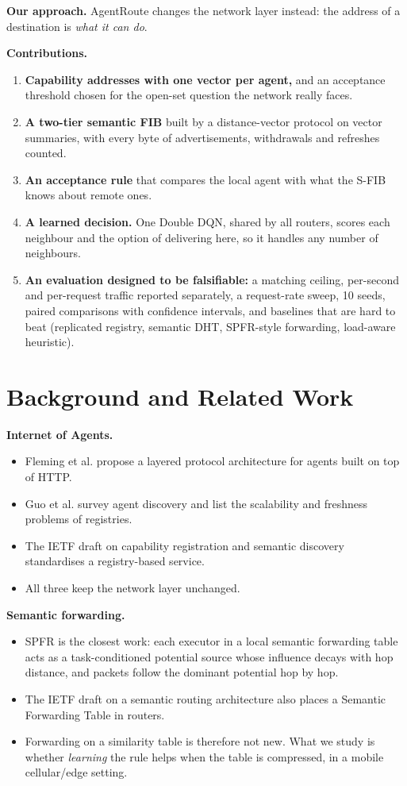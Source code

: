 \documentclass[journal]{IEEEtran}
\begin{document}
\textbf{Our approach.} AgentRoute changes the network layer instead: the address of a destination is \emph{what it can do}.

\textbf{Contributions.}

\begin{enumerate}
\item \textbf{Capability addresses with one vector per agent,} and an acceptance threshold chosen for the open-set question the network really faces.
\item \textbf{A two-tier semantic FIB} built by a distance-vector protocol on vector summaries, with every byte of advertisements, withdrawals and refreshes counted.
\item \textbf{An acceptance rule} that compares the local agent with what the S-FIB knows about remote ones.
\item \textbf{A learned decision.} One Double DQN, shared by all routers, scores each neighbour and the option of delivering here, so it handles any number of neighbours.
\item \textbf{An evaluation designed to be falsifiable:} a matching ceiling, per-second and per-request traffic reported separately, a request-rate sweep, 10 seeds, paired comparisons with confidence intervals, and baselines that are hard to beat (replicated registry, semantic DHT, SPFR-style forwarding, load-aware heuristic).
\end{enumerate}

\section{Background and Related Work}
\textbf{Internet of Agents.}

\begin{itemize}
\item Fleming et al. \cite{ref1} propose a layered protocol architecture for agents built on top of HTTP.
\item Guo et al. \cite{ref3} survey agent discovery and list the scalability and freshness problems of registries.
\item The IETF draft on capability registration and semantic discovery \cite{ref4} standardises a registry-based service.
\item All three keep the network layer unchanged.
\end{itemize}

\textbf{Semantic forwarding.}

\begin{itemize}
\item SPFR \cite{ref2} is the closest work: each executor in a local semantic forwarding table acts as a task-conditioned potential source whose influence decays with hop distance, and packets follow the dominant potential hop by hop.
\item The IETF draft on a semantic routing architecture \cite{ref14} also places a Semantic Forwarding Table in routers.
\item Forwarding on a similarity table is therefore not new. What we study is whether \emph{learning} the rule helps when the table is compressed, in a mobile cellular/edge setting.
\end{itemize}
\end{document}
